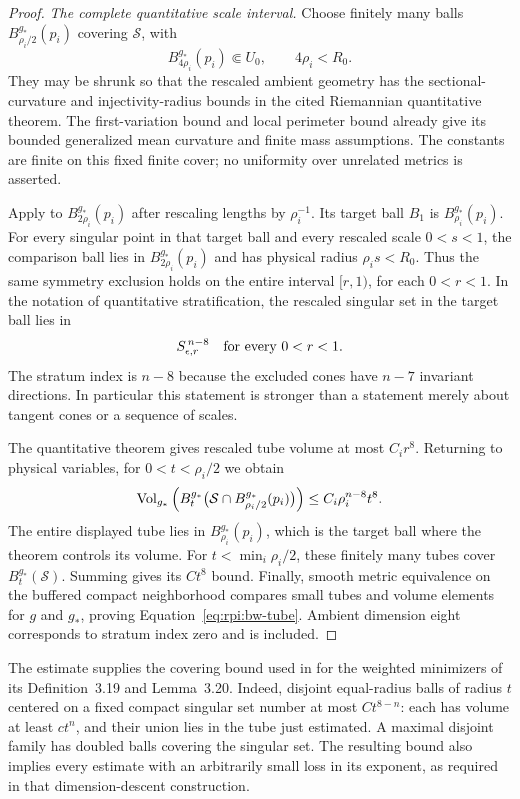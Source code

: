 \begin{proof}
\emph{The complete quantitative scale interval.}
Choose finitely many balls $B_{\rho_i/2}^{g_*}(p_i)$
covering $\mathcal S$, with
\[
 B_{4\rho_i}^{g_*}(p_i)\Subset U_0,
 \qquad 4\rho_i<R_0.
\]
They may be shrunk so that the rescaled ambient geometry has
the sectional-curvature and injectivity-radius bounds in the
cited Riemannian quantitative theorem. The first-variation
bound and local perimeter bound already give its bounded
generalized mean curvature and finite mass assumptions.
The constants are finite on this fixed finite cover; no
uniformity over unrelated metrics is asserted.

Apply \cite[Theorem~1.3]{NaberValtorta2020} to
$B_{2\rho_i}^{g_*}(p_i)$ after rescaling lengths by
$\rho_i^{-1}$. Its target ball $B_1$ is
$B_{\rho_i}^{g_*}(p_i)$. For every singular point in that
target ball and every rescaled scale $0<s<1$, the comparison
ball lies in $B_{2\rho_i}^{g_*}(p_i)$ and has physical
radius $\rho_i s<R_0$. Thus the same symmetry exclusion
holds on the entire interval $[r,1)$, for each $0<r<1$.
In the notation of quantitative stratification, the rescaled
singular set in the target ball lies in
\[
 S_{\epsilon,r}^{\,n-8}
       \quad\hbox{for every }0<r<1.
\]
The stratum index is $n-8$ because the excluded cones have
$n-7$ invariant directions. In particular this statement is
stronger than a statement merely about tangent cones or a
sequence of scales.

The quantitative theorem gives rescaled tube volume at most
$C_i r^8$. Returning to physical variables, for
$0<t<\rho_i/2$ we obtain
\[
 \operatorname{Vol}_{g_*}\left(
 B_t^{g_*}\bigl(\mathcal S\cap
                    B_{\rho_i/2}^{g_*}(p_i)\bigr)\right)
       \le C_i\rho_i^{n-8}t^8.
\]
The entire displayed tube lies in $B_{\rho_i}^{g_*}(p_i)$,
which is the target ball where the theorem controls its volume.
For $t<\min_i\rho_i/2$, these finitely many tubes cover
$B_t^{g_*}(\mathcal S)$. Summing gives its $Ct^8$ bound.
Finally, smooth metric equivalence on the buffered compact
neighborhood compares small tubes and volume elements for $g$
and $g_*$, proving Equation~\eqref{eq:rpi:bw-tube}.
Ambient dimension eight corresponds to stratum index zero and
is included.
\end{proof}

The estimate supplies the covering bound used in
\cite[Theorem~3.34]{BrendleWang2026} for the weighted minimizers of
its Definition~3.19 and Lemma~3.20. Indeed, disjoint equal-radius
balls of radius $t$ centered on a fixed compact singular set number
at most $Ct^{8-n}$: each has volume at least $ct^n$, and their
union lies in the tube just estimated. A maximal disjoint family
has doubled balls covering the singular set. The resulting bound
also implies every estimate with an arbitrarily small loss in its
exponent, as required in that dimension-descent construction.
